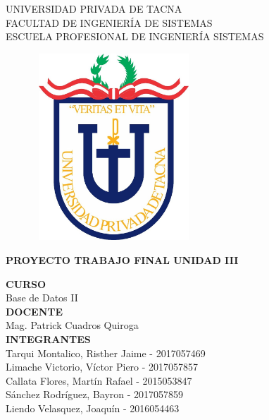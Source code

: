 \documentclass[12pt,a4paper,oneside]{book}
\begin{document}
	
	\thispagestyle{empty} 
	
	\begin{center} 
		\LARGE{UNIVERSIDAD PRIVADA DE TACNA} \\[0.5cm] 
		\Large{FACULTAD DE INGENIERÍA DE SISTEMAS}\\[0.5cm] 
		\large{ ESCUELA PROFESIONAL DE INGENIERÍA SISTEMAS} 
	\end{center}
	
	\begin{figure}[htb]
		\centering \includegraphics[width=6cm, height=7cm]{img/uptlogo.jpg}
	\end{figure}
	
	\begin{center} 
			\LARGE{\bf PROYECTO TRABAJO FINAL \newline UNIDAD III }\\ \vspace{.25cm}
		
	\end{center}

	\begin{center} 
		
		\textbf {CURSO}\\ 
		\large Base de Datos II \\
		
		\textbf {DOCENTE}\\
		\large Mag. Patrick Cuadros Quiroga\\
	
		\textbf {INTEGRANTES}\\
		\large Tarqui Montalico, Risther Jaime - 2017057469 \\
		\large Limache Victorio, V\'ictor Piero - 2017057857 \\
		\large Callata Flores, Mart\'in Rafael - 2015053847 \\
		\large S\'anchez Rodr\'iguez, Bayron - 2017057859 \\
		\large Liendo Velasquez, Joaqu\'in - 2016054463 \\
		
		
	\end{center}
\end{document}
